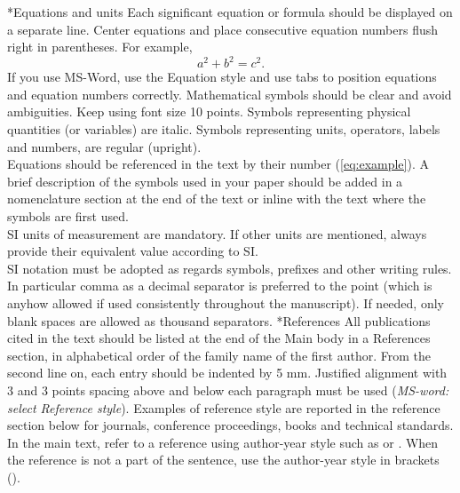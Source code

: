 \documentclass[twocolumn, a4paper,10pt]{article}
\makeatletter
\renewcommand\subsection{\@startsection{subsection}{1}{\z@}{\z@}{\z@}{\normalfont\normalsize\bfseries}}
\renewcommand\subsection{\@startsection{subsection}{1}{\z@}{\z@}{0.1pt}{\normalfont\normalsize\bfseries}}
\makeatother
\begin{document}
\subsection*{Equations and units}
Each significant equation or formula should be displayed on a separate line. Center equations and place consecutive equation numbers flush right in parentheses. For example,
\begin{equation}\label{eq:example}
  a^2+b^2=c^2.
\end{equation}
If you use MS-Word, use the Equation style and use tabs to position equations and equation numbers correctly.
Mathematical symbols should be clear and avoid ambiguities. Keep using font size 10 points. Symbols representing physical quantities (or variables) are italic. Symbols representing units, operators, labels and numbers, are regular (upright).\\
Equations should be referenced in the text by their number (\ref{eq:example}). A brief description of the symbols used in your paper should be added in a nomenclature section at the end of the text or inline with the text where the symbols are first used.\\
SI units of measurement are mandatory. If other units are mentioned, always provide their equivalent value according to SI.\\
SI notation must be adopted as regards symbols, prefixes and other writing rules. In particular comma as a decimal separator is preferred to the point (which is anyhow allowed if used consistently throughout the manuscript). If needed, only blank spaces are allowed as thousand separators.
\subsection*{References}
All publications cited in the text should be listed at the end of the Main body in a References section, in alphabetical order of the family name of the first author. From the second line on, each entry should be indented by 5 mm. Justified alignment with 3 and 3 points spacing above and below each paragraph must be used (\textit{MS-word: select \textit{Reference style}}). Examples of reference style are reported in the reference section below for journals, conference proceedings, books and technical standards.\\
In the main text, refer to a reference using author-year style such as \citet{Clarke2015:1} or \citet{ChuMajumdar2012}. When the reference is not a part of the sentence, use the author-year style in brackets (\cite{Clarke2015:1, ChuMajumdar2012,Monarim2014, BSDO2011, Mahdavi2011,iso52017}).
\end{document}
